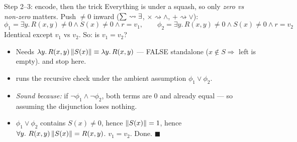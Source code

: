 \documentclass[9pt,aspectratio=169]{beamer}
\begin{document}
\begin{frame}[fragile]{Step 2--3: encode, then the trick}
Everything is under a squash, so only \emph{zero vs non-zero} matters. Push $\neq0$ inward
($\sum_{}\rightsquigarrow\exists$, $\times\rightsquigarrow\wedge$, $+\rightsquigarrow\vee$):
\[
\phi_1=\exists y.\,R(x,y){\neq}0\wedge S(x){\neq}0\wedge r{=}v_1,\qquad
\phi_2=\exists y.\,R(x,y){\neq}0\wedge S(x){\neq}0\wedge r{=}v_2
\]
\centering Identical \alert{except $v_1$ vs $v_2$}. So: is $v_1=v_2$?
\vspace{3mm}
\begin{itemize}
\item<2-> Needs $\lambda y.\,R(x,y)\left\lVert S(x) \right\rVert\equiv\lambda y.\,R(x,y)$ --- \alert{FALSE standalone}
      ($x\notin S\Rightarrow$ left is empty). \udp{} and \spes{} stop here.
\item<3-> \QED{} runs the recursive check under the \alert{ambient assumption
      $\phi_1\vee\phi_2$}.
\item<4-> \emph{Sound because:} if $\neg\phi_1\wedge\neg\phi_2$, both terms are $0$ and
      already equal --- so assuming the disjunction loses nothing.
\item<5-> $\phi_1\vee\phi_2$ contains $S(x)\neq0$, hence $\left\lVert S(x) \right\rVert=1$, hence
      $\forall y.\ R(x,y)\left\lVert S(x) \right\rVert=R(x,y)$. \alert{$v_1=v_2$. Done.} $\blacksquare$
\end{itemize}
\end{frame}
\end{document}
